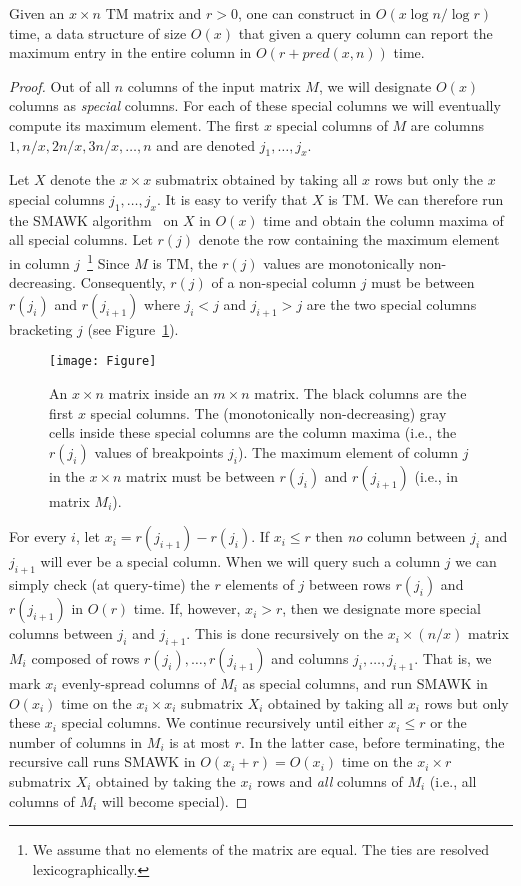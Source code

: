 \documentclass{llncs}
\begin{document}
\begin{lemma} \label{lemma:micro}
Given an $x\times n$ TM matrix and $r >0$, one can construct in $O(x \log n /\log r)$ time, a data structure of size $O(x)$ that given a query column can report the maximum entry in the entire column in 
$O(r+pred(x,n))$ time. 
\end{lemma}
\begin{proof}
Out of all $n$ columns of the input matrix $M$, we will designate
$O(x)$ columns as {\em special} columns. For each of these special columns we will eventually compute its maximum element.  
The first $x$ special columns of $M$ are  columns $1, n/x, 2n/x, 3n/x,\ldots, n$ and are denoted $j_1,\ldots, j_x$. 

Let $X$ denote the $x \times x$ submatrix obtained by taking all $x$
rows but only the $x$ special columns $j_1,\ldots, j_x$. It is easy to verify that $X$
is TM. We can therefore run the SMAWK
algorithm~\cite{SMAWK} on $X$ in  $O(x)$ time and obtain the column
maxima of all special columns. 
Let $r(j)$ denote the row containing the maximum element in column $j$~\footnote{We assume that no elements of the matrix are equal. The ties are resolved lexicographically.}
Since $M$ is TM, the $r(j)$ values are monotonically
non-decreasing. Consequently, $r(j)$ of a non-special column $j$ must be
between $r(j_i)$ and $r(j_{i+1})$ where $j_i<j$ and $j_{i+1}>j$ are
the two special  columns bracketing $j$  
 (see Figure~\ref{fig}). 
 
\begin{figure}[h!]
   \centering
   \texttt{[image: Figure]}
   \caption{An $x\times n$ matrix inside an $m\times n$ matrix. The
     black columns are the first $x$ special columns. The
     (monotonically  non-decreasing) gray cells inside these special
     columns are the column maxima (i.e., the $r(j_i)$ values of breakpoints $j_i$). The maximum element of column $j$ in the $x\times n$ matrix must be between $r(j_i)$ and $r(j_{i+1})$ (i.e., in matrix $M_i$).}
  \label{fig}
 \end{figure}

For every $i$, let $x_i = r(j_{i+1}) - r(j_i)$. If $x_i  \le r$ then
{\em no} column between $j_i$ and $j_{i+1}$ will ever be a special
column. When we will query such a column $j$ we can simply check
(at query-time) the $r$ elements of $j$ between rows $r(j_i)$ and
$r(j_{i+1})$ in $O(r)$ time. If, however, $x_i  > r$, then we designate
more special columns between $j_i$ and $j_{i+1}$. This is done
recursively on the $x_i  \times (n/x)$ matrix $M_i$ composed of
rows $r(j_i),\ldots, r(j_{i+1})$ and columns $j_i,\ldots,
j_{i+1}$. That is, we mark $x_i$ evenly-spread columns of $M_i$ as
special columns,  and run SMAWK in $O(x_i)$ time on the $x_i \times
x_i$ submatrix $X_i$   obtained by taking all $x_i$ rows but only
these $x_i$ special columns. We continue recursively until either $x_i
\le r$ or the number of columns in $M_i$ is at most $r$. In the
latter case, before terminating, the recursive call runs SMAWK in $O(x_i+r)=O(x_i)$ time on the $x_i
\times r$ submatrix $X_i$ obtained by taking the $x_i$ rows and {\em
  all} columns of $M_i$ (i.e., all columns of $M_i$ will become
special). 


\end{proof}
\end{document}
